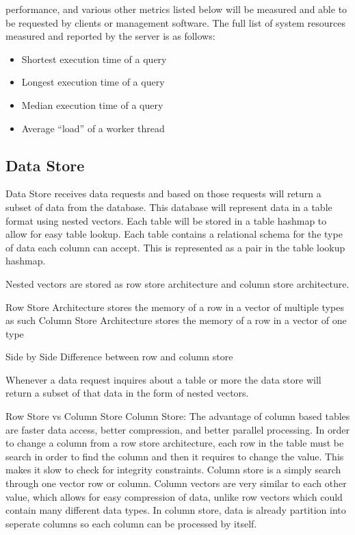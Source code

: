 \documentclass[letterpaper, 12pt]{article}
\begin{document}
performance, and various other metrics listed below will be measured and able to be
requested by clients or management software. The full list of system resources measured
and reported by the server is as follows:
\begin{itemize}
 \item Shortest execution time of a query
 \item Longest execution time of a query
 \item Median execution time of a query
 \item Average ``load'' of a worker thread
\end{itemize}
\par\vspace{\baselineskip}

\subsection{Data Store}
Data Store receives data requests and based on those requests will return a subset of data from
the database. This database will represent data in a table format using nested vectors. Each table
will be stored in a table hashmap to allow for easy table lookup. Each table contains a relational
schema for the type of data each column can accept. This is represented as a pair in the table
lookup hashmap.


Nested vectors are stored as row store architecture and column store architecture.

Row Store Architecture stores the memory of a row in a vector of multiple types as such
Column Store Architecture stores the memory of a row in a vector of one type

Side by Side Difference between row and column store

Whenever a data request inquires about a table or more the data store will return a subset of that
data in the form of nested vectors.


Row Store vs Column Store
Column Store:
The advantage of column based tables are faster data access, better compression, and better parallel processing.
In order to change a column from a row store architecture, each row in the table must be search in order to find the
column and then it requires to change the value. This makes it slow to check for integrity constraints. Column store
is a simply search through one vector row or column. Column vectors are very similar to each other value, which allows
for easy compression of data, unlike row vectors which could contain many different data types. In column store, data
is already partition into seperate columns so each column can be processed by itself.
\end{document}
